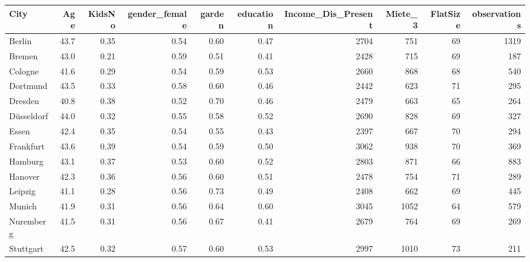 \begin{table}[ht]
\centering
\begin{tabular}{lrrrrrrrrr}
  \hline
City & Age & KidsNo & gender\_female & garden & education & Income\_Dis\_Present & Miete\_3 & FlatSize & observations \\ 
  \hline
Berlin & 43.7 & 0.35 & 0.54 & 0.60 & 0.47 & 2704 & 751 & 69 & 1319 \\ 
  Bremen & 43.0 & 0.21 & 0.59 & 0.51 & 0.41 & 2428 & 715 & 69 & 187 \\ 
  Cologne & 41.6 & 0.29 & 0.54 & 0.59 & 0.53 & 2660 & 868 & 68 & 540 \\ 
  Dortmund & 43.5 & 0.33 & 0.58 & 0.60 & 0.46 & 2442 & 623 & 71 & 295 \\ 
  Dresden & 40.8 & 0.38 & 0.52 & 0.70 & 0.46 & 2479 & 663 & 65 & 264 \\ 
  Düsseldorf & 44.0 & 0.32 & 0.55 & 0.58 & 0.52 & 2690 & 828 & 69 & 327 \\ 
  Essen & 42.4 & 0.35 & 0.54 & 0.55 & 0.43 & 2397 & 667 & 70 & 294 \\ 
  Frankfurt & 43.6 & 0.39 & 0.54 & 0.59 & 0.50 & 3062 & 938 & 70 & 369 \\ 
  Hamburg & 43.1 & 0.37 & 0.53 & 0.60 & 0.52 & 2803 & 871 & 66 & 883 \\ 
  Hanover & 42.3 & 0.36 & 0.56 & 0.60 & 0.51 & 2478 & 754 & 71 & 289 \\ 
  Leipzig & 41.1 & 0.28 & 0.56 & 0.73 & 0.49 & 2408 & 662 & 69 & 445 \\ 
  Munich & 41.9 & 0.31 & 0.56 & 0.64 & 0.60 & 3045 & 1052 & 64 & 579 \\ 
  Nuremberg & 41.5 & 0.31 & 0.56 & 0.67 & 0.41 & 2679 & 764 & 69 & 269 \\ 
  Stuttgart & 42.5 & 0.32 & 0.57 & 0.60 & 0.53 & 2997 & 1010 & 73 & 211 \\ 
   \hline
\end{tabular}
\end{table}
